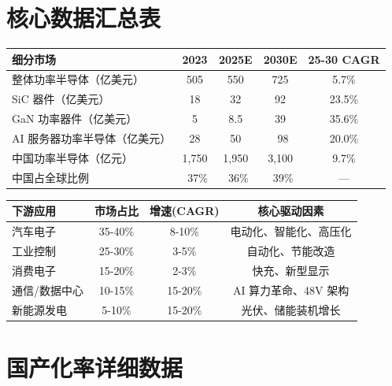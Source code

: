 
\section{核心数据汇总表}

\begin{exhibitbox}[表 A-1：全球功率半导体市场规模预测]
\centering
\small
\begin{tabularx}{\textwidth}{X c c c c}
\toprule
\textbf{细分市场} & \textbf{2023} & \textbf{2025E} & \textbf{2030E} & \textbf{25-30 CAGR} \\
\midrule
整体功率半导体（亿美元） & 505 & 550 & 725 & 5.7\% \\
SiC 器件（亿美元） & 18 & 32 & 92 & 23.5\% \\
GaN 功率器件（亿美元） & 5 & 8.5 & 39 & 35.6\% \\
AI 服务器功率半导体（亿美元） & 28 & 50 & ~98 & 20.0\% \\
\midrule
中国功率半导体（亿元） & 1,750 & 1,950 & 3,100 & 9.7\% \\
中国占全球比例 & ~37\% & ~36\% & ~39\% & — \\
\bottomrule
\end{tabularx}
\end{exhibitbox}

\begin{exhibitbox}[表 A-2：各应用领域市场规模与增速对比]
\centering
\small
\begin{tabularx}{\textwidth}{X c c c}
\toprule
\textbf{下游应用} & \textbf{市场占比} & \textbf{增速(CAGR)} & \textbf{核心驱动因素} \\
\midrule
汽车电子 & 35-40\% & 8-10\% & 电动化、智能化、高压化 \\
工业控制 & 25-30\% & 3-5\% & 自动化、节能改造 \\
消费电子 & 15-20\% & 2-3\% & 快充、新型显示 \\
通信/数据中心 & 10-15\% & 15-20\% & AI 算力革命、48V 架构 \\
新能源发电 & 5-10\% & 15-20\% & 光伏、储能装机增长 \\
\bottomrule
\end{tabularx}
\end{exhibitbox}

\section{国产化率详细数据}

